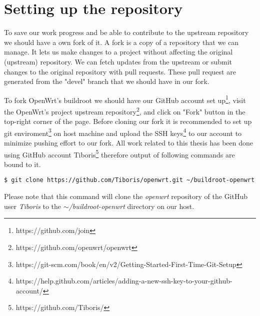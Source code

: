 \chapter{Setting up the repository}\label{set_repo}

To save our work progress and be able to contribute to the upstream repository we should have a own fork of it.
A fork is a copy of a repository that we can manage.
It lets us make changes to a project without affecting the original (upstream) repository.
We can fetch updates from the upstream or submit changes to the original repository with pull requests.
These pull request are generated from the "devel" branch that we should have in our fork.

To fork OpenWrt's buildroot we should have our GitHub account set up\footnote{https://github.com/join}, visit the OpenWrt's project upstream repository\footnote{https://github.com/openwrt/openwrt}, and click on "Fork" button in the top-right corner of the page.
Before cloning our fork it is recommended to set up git enviroment\footnote{https://git-scm.com/book/en/v2/Getting-Started-First-Time-Git-Setup} on host machine and upload the SSH keys\footnote{https://help.github.com/articles/adding-a-new-ssh-key-to-your-github-account/} to our account to minimize pushing effort to our fork.
All work related to this thesis has been done using GitHub account Tiboris\footnote{https://github.com/Tiboris/} therefore output of following commands are bound to it.
\begin{lstlisting}[columns=fixed,basicstyle=\ttfamily\footnotesize,basicstyle=\ttfamily\footnotesize,tabsize=4,backgroundcolor=\color{yellow!10}]
$ git clone https://github.com/Tiboris/openwrt.git ~/buildroot-openwrt
\end{lstlisting}
Please note that this command will clone the {\it openwrt} repository of the GitHub user {\it Tiboris} to the {\it $\sim$/buildroot-openwrt} directory on our host.

